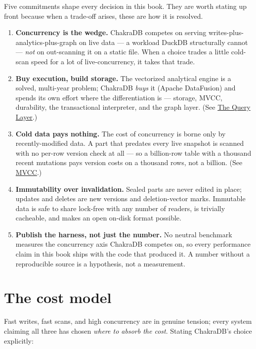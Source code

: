 \documentclass[
  11pt,
  openany]{book}
\begin{document}
Five commitments shape every decision in this book. They are worth
stating up front because when a trade-off arises, these are how it is
resolved.

\begin{enumerate}
\def\labelenumi{\arabic{enumi}.}
\item
  \textbf{Concurrency is the wedge.} ChakraDB competes on serving
  writes-plus-analytics-plus-graph on live data --- a workload DuckDB
  structurally cannot --- \emph{not} on out-scanning it on a static
  file. When a choice trades a little cold-scan speed for a lot of
  live-concurrency, it takes that trade.
\item
  \textbf{Buy execution, build storage.} The vectorized analytical
  engine is a solved, multi-year problem; ChakraDB \emph{buys} it
  (Apache DataFusion) and spends its own effort where the
  differentiation is --- storage, MVCC, durability, the transactional
  interpreter, and the graph layer. (See
  \href{../engine/query-router.md}{The Query Layer}.)
\item
  \textbf{Cold data pays nothing.} The cost of concurrency is borne only
  by recently-modified data. A part that predates every live snapshot is
  scanned with no per-row version check at all --- so a billion-row
  table with a thousand recent mutations pays version costs on a
  thousand rows, not a billion. (See \href{../engine/mvcc.md}{MVCC}.)
\item
  \textbf{Immutability over invalidation.} Sealed parts are never edited
  in place; updates and deletes are new versions and deletion-vector
  marks. Immutable data is safe to share lock-free with any number of
  readers, is trivially cacheable, and makes an open on-disk format
  possible.
\item
  \textbf{Publish the harness, not just the number.} No neutral
  benchmark measures the concurrency axis ChakraDB competes on, so every
  performance claim in this book ships with the code that produced it. A
  number without a reproducible source is a hypothesis, not a
  measurement.
\end{enumerate}

\section{The cost model}\label{the-cost-model}

Fast writes, fast scans, and high concurrency are in genuine tension;
every system claiming all three has chosen \emph{where to absorb the
cost}. Stating ChakraDB's choice explicitly:
\end{document}

